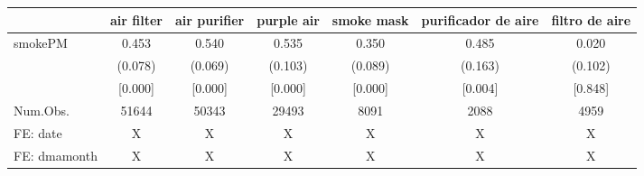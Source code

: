 \begin{table}
\centering
\begin{tabular}[t]{lcccccc}
\toprule
  & air filter & air purifier & purple air & smoke mask & purificador de aire & filtro de aire\\
\midrule
smokePM & 0.453 & 0.540 & 0.535 & 0.350 & 0.485 & 0.020\\
 & (0.078) & (0.069) & (0.103) & (0.089) & (0.163) & (0.102)\\
 & {}[0.000] & {}[0.000] & {}[0.000] & {}[0.000] & {}[0.004] & {}[0.848]\\
\midrule
Num.Obs. & 51644 & 50343 & 29493 & 8091 & 2088 & 4959\\
FE: date & X & X & X & X & X & X\\
FE: dmamonth & X & X & X & X & X & X\\
\bottomrule
\end{tabular}
\end{table}
